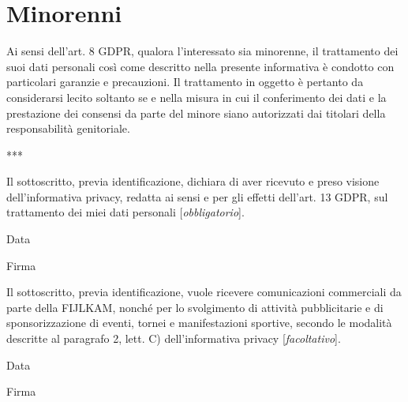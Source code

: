 \documentclass{djts}
\begin{document}
	\section*{Minorenni}
	Ai sensi dell'art. 8 GDPR, qualora l'interessato sia minorenne, il trattamento dei suoi dati personali così come descritto nella presente informativa è condotto con particolari garanzie e precauzioni. Il trattamento in oggetto è pertanto da considerarsi lecito soltanto se e nella misura in cui il conferimento dei dati e la prestazione dei consensi da parte del minore siano autorizzati dai titolari della responsabilità genitoriale.
	
	\begin{center}
		\vspace{0.3in}
		***
		\vspace{0.3in}
	\end{center}
	
	Il sottoscritto, previa identificazione, dichiara di aver ricevuto e preso visione dell'informativa privacy, redatta ai sensi e per gli effetti dell'art. 13 GDPR, sul trattamento dei miei dati personali [\textit{obbligatorio}].
	\begin{center}
		\begin{minipage}{0.4\linewidth}
			\centering
			Data \\[5pt]
		\end{minipage}
		\begin{minipage}{0.4\linewidth}
			\centering
			Firma \\[5pt]
		\end{minipage}
	\end{center}
	\vspace{0.5in}
	
	Il sottoscritto, previa identificazione, vuole ricevere comunicazioni commerciali da parte della FIJLKAM, nonché per lo svolgimento di attività pubblicitarie e di sponsorizzazione di eventi, tornei e manifestazioni sportive, secondo le modalità descritte al paragrafo 2, lett. C) dell'informativa privacy [\textit{facoltativo}].
	\begin{center}
		\begin{minipage}{0.4\linewidth}
			\centering
			Data \\[5pt]
		\end{minipage}
		\begin{minipage}{0.4\linewidth}
			\centering
			Firma \\[5pt]
		\end{minipage}
	\end{center}
	\vspace{0.5in}
	
\end{document}
